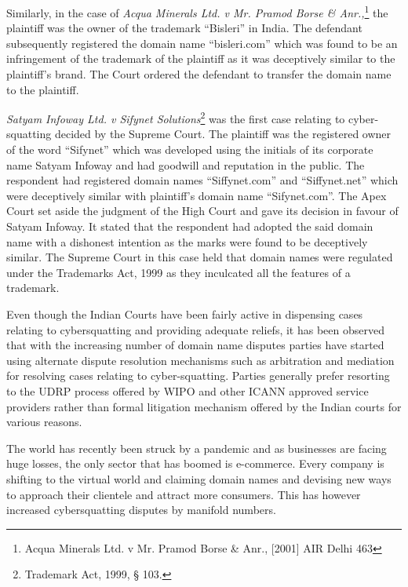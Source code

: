 \begin{multicols}{2}
\noi
Similarly, in the case of \textit{Acqua Minerals Ltd. v Mr. Pramod Borse \& Anr.,}\footnote{Acqua Minerals Ltd. v Mr. Pramod Borse \& Anr., [2001] AIR Delhi 463} the plaintiff was
the owner of the trademark “Bisleri” in India. The defendant subsequently registered the
domain name “bisleri.com” which was found to be an infringement of the trademark of the
plaintiff as it was deceptively similar to the plaintiff’s brand. The Court ordered the defendant
to transfer the domain name to the plaintiff.

\noi
\textit{Satyam Infoway Ltd. v Sifynet Solutions}\footnote{Trademark Act, 1999, § 103.} was the first case relating to cyber-squatting decided by the Supreme Court. The plaintiff was the registered owner of the word “Sifynet” which was developed using the initials of its corporate name Satyam Infoway and had
goodwill and reputation in the public. The respondent had registered domain names
“Siffynet.com” and “Siffynet.net” which were deceptively similar with plaintiff’s domain
name “Sifynet.com”. The Apex Court set aside the judgment of the High Court and gave its
decision in favour of Satyam Infoway. It stated that the respondent had adopted the said
domain name with a dishonest intention as the marks were found to be deceptively similar.
The Supreme Court in this case held that domain names were regulated under the Trademarks
Act, 1999 as they inculcated all the features of a trademark.

\noi
Even though the Indian Courts have been fairly active in dispensing cases relating to cybersquatting and providing adequate reliefs, it has been observed that with the increasing number
of domain name disputes parties have started using alternate dispute resolution mechanisms
such as arbitration and mediation for resolving cases relating to cyber-squatting. Parties
generally prefer resorting to the UDRP process offered by WIPO and other ICANN approved service providers rather than formal litigation mechanism offered by the Indian courts for
various reasons.


\noi
The world has recently been struck by a pandemic and as businesses are facing huge losses,
the only sector that has boomed is e-commerce. Every company is shifting to the virtual
world and claiming domain names and devising new ways to approach their clientele and
attract more consumers. This has however increased cybersquatting disputes by manifold
numbers.


\end{multicols}
